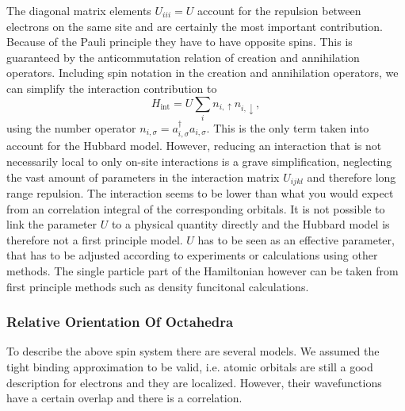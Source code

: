 \documentclass[a4paper,10pt]{report}
\begin{document}
The diagonal matrix elements $U_{iii} = U$ account for the repulsion between electrons on the same site and are certainly the most important contribution.
Because of the Pauli principle they have to have opposite spins. 
This is guaranteed by the anticommutation relation of creation and annihilation operators.
Including spin notation in the creation and annihilation operators, we can simplify the interaction contribution to 
\begin{equation}
 H_{\text{int}} = U \sum_i n_{i,\uparrow} n_{i,\downarrow},
\end{equation}
using the number operator $n_{i,\sigma} = a^{\dagger}_{i,\sigma} a_{i,\sigma}$.
This is the only term taken into account for the Hubbard model.
However, reducing an interaction that is not necessarily local to only on-site interactions is a grave simplification, 
neglecting the vast amount of parameters in the interaction matrix $U_{ijkl}$ and therefore long range repulsion.
The interaction seems to be lower than what you would expect from an correlation integral of the corresponding orbitals.
It is not possible to link the parameter $U$ to a physical quantity directly
and the Hubbard model is therefore not a first principle model. $U$ has to be seen as an effective parameter, that has to be adjusted according to experiments or calculations using
other methods.
The single particle part of the Hamiltonian however can be taken from first principle methods such as density funcitonal calculations.









\subsubsection{Relative Orientation Of Octahedra}




To describe the above spin system there are several models. We assumed the tight binding approximation to be valid, i.e. atomic orbitals
are still a good description for electrons and they are localized. However, their wavefunctions have a certain overlap and there is a correlation. 
\end{document}
